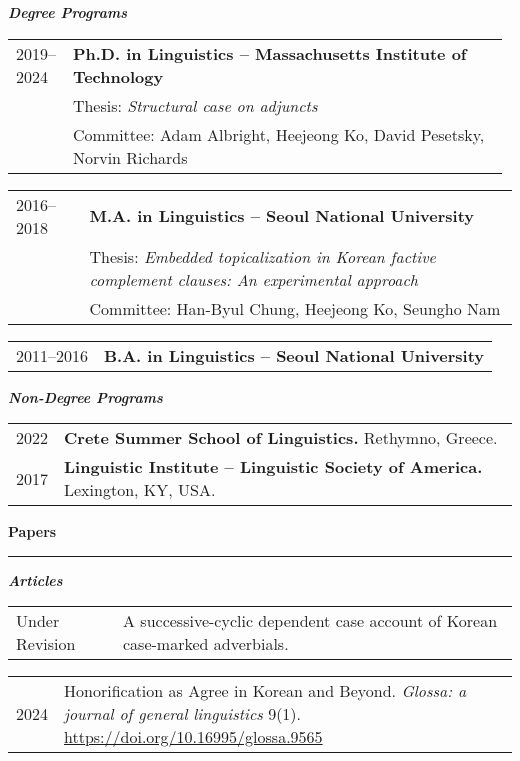 \documentclass[10pt]{article}
\makeatletter
\newcommand{\sect}[1]{\vspace{5mm} {\fontsize{14}{21}\selectfont \textbf{#1}} {\vspace{0.1cm}} \hrule {\vspace{0.3cm}}}
\newcommand{\subsect}[1]{\vspace{3mm} {\fontsize{11}{18}\selectfont \textit{\textbf{#1}}} {\vspace{0.3cm}}}
\newcommand{\paper}[2]{\begin{tabular}{@{}p{0.11\textwidth}p{0.87\textwidth}}{#1}&{#2}\\\end{tabular}\vspace{2mm}}
\makeatother
\begin{document}
\subsect{Degree Programs}

\begin{tabular}{@{}p{0.11\linewidth}p{0.87\linewidth}}
{2019--2024}&{\textbf{Ph.D. in Linguistics -- Massachusetts Institute of Technology}}\\
{}&{Thesis: {\textit{Structural case on adjuncts}}}\\
{}&{Committee: Adam Albright, Heejeong Ko, David Pesetsky, Norvin Richards}
\end{tabular}

\vspace{2mm}

\begin{tabular}{@{}p{}p{}}
{2016--2018}&{\textbf{M.A. in Linguistics -- Seoul National University}}\\
{}&{Thesis: {\textit{Embedded topicalization in Korean factive complement clauses: An experimental approach}}}\\
                  {}&{Committee: Han-Byul Chung, Heejeong Ko, Seungho Nam}\\
 \end{tabular}

\vspace{2mm}

\begin{tabular}{@{}p{}p{}}
{2011--2016}&{\textbf{B.A. in Linguistics -- Seoul National University}}\\
\end{tabular}

\vspace{2mm}

\subsect{Non-Degree Programs}

\begin{tabular}{@{}p{}p{}}
{2022}&{{\textbf{Crete Summer School of Linguistics.}} Rethymno, Greece.}\\
{2017}&{\textbf{Linguistic Institute -- Linguistic Society of America.} Lexington, KY, USA.}\\
\end{tabular}


{\sect{Papers}}

{\subsect{Articles}}

\paper{\fontsize{8}{12}\selectfont Under Revision}{A successive-cyclic dependent case account of Korean case-marked adverbials.}

\paper{2024}{Honorification as Agree in Korean and Beyond. {\textit{Glossa: a journal of general linguistics}} 9(1). {\href{https://doi.org/10.16995/glossa.9565}{https://doi.org/10.16995/glossa.9565}}}
\end{document}
